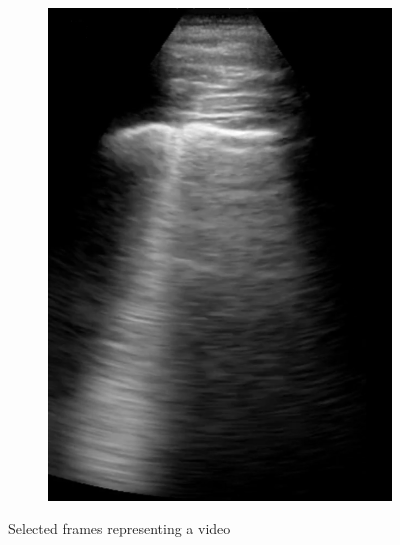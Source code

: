 \documentclass[11pt]{article} %
\begin{document}
\begin{figure}
\begin{subfigure}{0.25\textwidth}
		\includegraphics[width=\textwidth]{figuras/frame3.png}
		\end{subfigure}
	\caption{Selected frames representing a video}
	\end{figure}		
	
	

\end{document}
